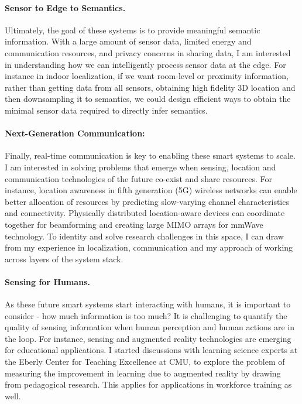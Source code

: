 \documentclass[10pt]{article}
\begin{document}
\paragraph{Sensor to Edge to Semantics. }
Ultimately, the goal of these systems is to provide meaningful semantic information. With a large amount of sensor data, limited energy and communication resources, and privacy concerns in sharing data, I am interested in understanding how we can intelligently process sensor data at the edge. For instance in indoor localization, if we want room-level or proximity information, rather than getting data from all sensors, obtaining high fidelity 3D location and then downsampling it to semantics, we could design efficient ways to obtain the minimal sensor data required to directly infer semantics. %

\paragraph{Next-Generation Communication: }
Finally, real-time communication is key to enabling these smart systems to scale. %
I am interested in solving problems that emerge when sensing, location and communication technologies of the future co-exist and share resources. For instance, location awareness in fifth generation (5G) wireless networks can enable better allocation of resources by predicting slow-varying channel characteristics and connectivity. Physically distributed location-aware devices can coordinate together for beamforming and creating large MIMO arrays for mmWave technology. %
To identity and solve research challenges in this space, I can draw from my experience in localization, communication and my approach of working across layers of the system stack. 

\paragraph{Sensing for Humans. }
As these future smart systems start interacting with humans, it is important to consider - how much information is too much? It is challenging to quantify the quality of sensing information when human perception and human actions are in the loop. 
For instance, sensing and augmented reality technologies are emerging for educational applications. 
I started discussions with learning science experts at the Eberly Center for Teaching Excellence at CMU, to explore the problem of measuring the improvement in learning due to augmented reality by drawing from pedagogical research. This applies for applications in workforce training as well.\\
\end{document}
